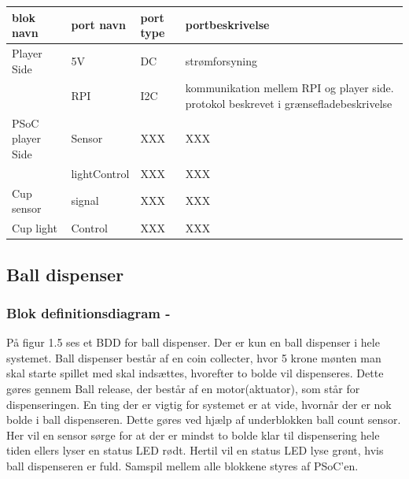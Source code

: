\documentclass[Arkitektur/System_main.tex]{subfiles}
\begin{document}
\begin{table}[]
\begin{tabular}{|l|l|l|l|}
\hline
blok navn        & port navn    & port type & portbeskrivelse                                                                      \\ \hline
Player Side      & 5V           & DC        & strømforsyning                                                                       \\ \hline
                 & RPI          & I2C       & kommunikation mellem RPI og player side. protokol beskrevet i grænsefladebeskrivelse \\ \hline
PSoC player Side & Sensor       & XXX       & XXX                                                                                  \\ \hline
                 & lightControl & XXX       & XXX                                                                                  \\ \hline
Cup sensor       & signal       & XXX       & XXX                                                                                  \\ \hline
Cup light        & Control      & XXX       & XXX                                                                                  \\ \hline
\end{tabular}
\end{table}

\subsection{Ball dispenser} \label{sec:balldispenser_hardware}
\subsubsection{Blok definitionsdiagram - }

På figur 1.5 ses et BDD for ball dispenser. Der er kun en ball dispenser i hele systemet. Ball dispenser består af en coin collecter, hvor 5 krone mønten man skal starte spillet med skal indsættes, hvorefter to bolde vil dispenseres. Dette gøres gennem Ball release, der består af en motor(aktuator), som står for dispenseringen. En ting der er vigtig for systemet er at vide, hvornår der er nok bolde i ball dispenseren. Dette gøres ved hjælp af underblokken ball count sensor. Her vil en sensor sørge for at der er mindst to bolde klar til dispensering hele tiden ellers lyser en status LED rødt. Hertil vil en status LED lyse grønt, hvis ball dispenseren er fuld. Samspil mellem alle blokkene styres af PSoC'en.
\end{document}
